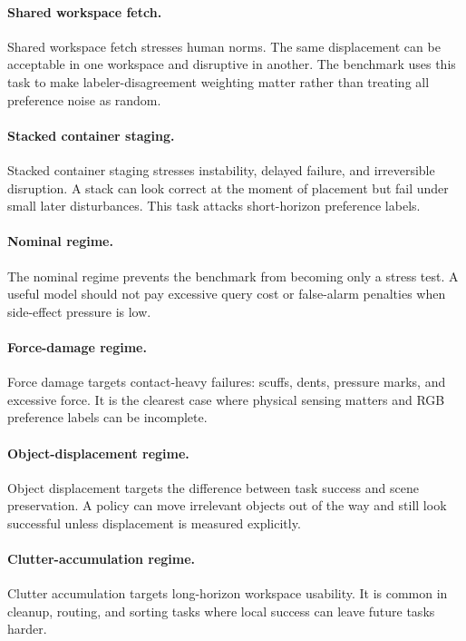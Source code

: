\documentclass{article}
\begin{document}
\paragraph{Shared workspace fetch.}
Shared workspace fetch stresses human norms. The same displacement can be acceptable in one workspace and disruptive in another. The benchmark uses this task to make labeler-disagreement weighting matter rather than treating all preference noise as random.

\paragraph{Stacked container staging.}
Stacked container staging stresses instability, delayed failure, and irreversible disruption. A stack can look correct at the moment of placement but fail under small later disturbances. This task attacks short-horizon preference labels.

\paragraph{Nominal regime.}
The nominal regime prevents the benchmark from becoming only a stress test. A useful model should not pay excessive query cost or false-alarm penalties when side-effect pressure is low.

\paragraph{Force-damage regime.}
Force damage targets contact-heavy failures: scuffs, dents, pressure marks, and excessive force. It is the clearest case where physical sensing matters and RGB preference labels can be incomplete.

\paragraph{Object-displacement regime.}
Object displacement targets the difference between task success and scene preservation. A policy can move irrelevant objects out of the way and still look successful unless displacement is measured explicitly.

\paragraph{Clutter-accumulation regime.}
Clutter accumulation targets long-horizon workspace usability. It is common in cleanup, routing, and sorting tasks where local success can leave future tasks harder.
\end{document}
